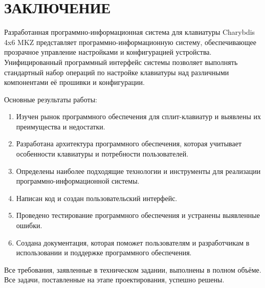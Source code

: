 \section*{ЗАКЛЮЧЕНИЕ}

Разработанная программно‑информационная система для клавиатуры Charybdis 4x6 MKZ представляет программно-информационную систему, обеспечивающее прозрачное управление настройками и конфигурацией устройства. Унифицированный программный интерфейс системы позволяет выполнять стандартный набор операций по настройке клавиатуры над различными компонентами её прошивки и конфигурации.

Основные результаты работы:

\begin{enumerate}
\item Изучен рынок программного обеспечения для сплит-клавиатур и выявлены их преимущества и недостатки.
\item Разработана архитектура программного обеспечения, которая учитывает особенности клавиатуры и потребности пользователей.
\item Определены наиболее подходящие технологии и инструменты для реализации программно-информационной системы.
\item Написан код и создан пользовательский интерфейс.
\item Проведено тестирование программного обеспечения и устранены выявленные ошибки.
\item Создана документация, которая поможет пользователям и разработчикам в использовании и поддержке программного обеспечения.
\end{enumerate}

Все требования, заявленные в техническом задании, выполнены в полном объёме. Все задачи, поставленные на этапе проектирования, успешно решены.

